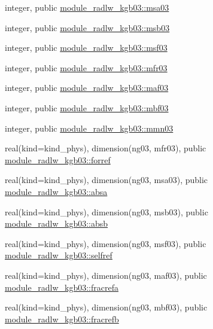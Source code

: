 \begin{DoxyCompactItemize}
\item 
integer, public \hyperlink{namespacemodule__radlw__kgb03_a78658032153f7a4cbeaa198cbe661244}{module\+\_\+radlw\+\_\+kgb03\+::msa03}
\item 
integer, public \hyperlink{namespacemodule__radlw__kgb03_ac57ba9584cbc3a5e4e2e0a6b548d21e9}{module\+\_\+radlw\+\_\+kgb03\+::msb03}
\item 
integer, public \hyperlink{namespacemodule__radlw__kgb03_af553bb46aa3ea6bcbb945cb2c2778955}{module\+\_\+radlw\+\_\+kgb03\+::msf03}
\item 
integer, public \hyperlink{namespacemodule__radlw__kgb03_a4ea1e58a39585adc087718b92a16b529}{module\+\_\+radlw\+\_\+kgb03\+::mfr03}
\item 
integer, public \hyperlink{namespacemodule__radlw__kgb03_a90d1081db011f0682cb4a83c40c5bb23}{module\+\_\+radlw\+\_\+kgb03\+::maf03}
\item 
integer, public \hyperlink{namespacemodule__radlw__kgb03_a655fff8711d78d62ae9d4fa27d02621a}{module\+\_\+radlw\+\_\+kgb03\+::mbf03}
\item 
integer, public \hyperlink{namespacemodule__radlw__kgb03_ab4e84b10460930267256c0e5a1fe7a55}{module\+\_\+radlw\+\_\+kgb03\+::mmn03}
\item 
real(kind=kind\+\_\+phys), dimension(ng03, mfr03), public \hyperlink{namespacemodule__radlw__kgb03_afcc55fa81ba6369b56d29db2342c2e6a}{module\+\_\+radlw\+\_\+kgb03\+::forref}
\item 
real(kind=kind\+\_\+phys), dimension(ng03, msa03), public \hyperlink{namespacemodule__radlw__kgb03_ac65fd4afedbd4bfa2c87c5e4f060a1d4}{module\+\_\+radlw\+\_\+kgb03\+::absa}
\item 
real(kind=kind\+\_\+phys), dimension(ng03, msb03), public \hyperlink{namespacemodule__radlw__kgb03_aa84ba66e0a3cc018b03bd13c9c21e133}{module\+\_\+radlw\+\_\+kgb03\+::absb}
\item 
real(kind=kind\+\_\+phys), dimension(ng03, msf03), public \hyperlink{namespacemodule__radlw__kgb03_a6bb40d898660e6dfc056d3efe1d0c544}{module\+\_\+radlw\+\_\+kgb03\+::selfref}
\item 
real(kind=kind\+\_\+phys), dimension(ng03, maf03), public \hyperlink{namespacemodule__radlw__kgb03_a26e901a002e789933c5c9b622f3a0932}{module\+\_\+radlw\+\_\+kgb03\+::fracrefa}
\item 
real(kind=kind\+\_\+phys), dimension(ng03, mbf03), public \hyperlink{namespacemodule__radlw__kgb03_af1d33a7362e73bf40ef592bc9863b612}{module\+\_\+radlw\+\_\+kgb03\+::fracrefb}
\item 

\end{DoxyCompactItemize}

